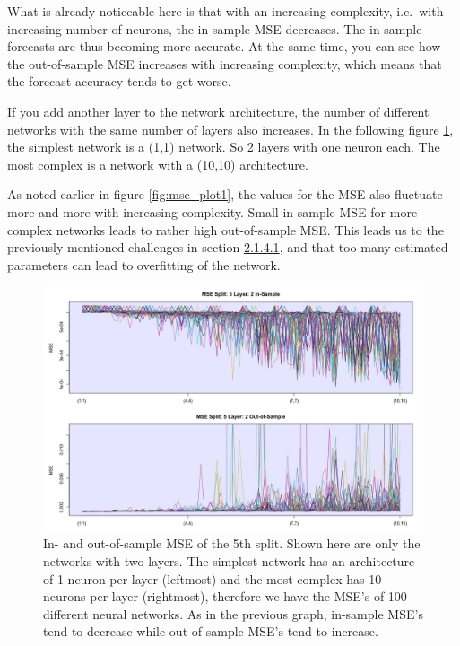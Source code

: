\documentclass[
]{article}
\begin{document}
What is already noticeable here is that with an increasing complexity,
i.e.~with increasing number of neurons, the in-sample MSE decreases. The
in-sample forecasts are thus becoming more accurate. At the same time,
you can see how the out-of-sample MSE increases with increasing
complexity, which means that the forecast accuracy tends to get worse.

\newpage

If you add another layer to the network architecture, the number of
different networks with the same number of layers also increases. In the
following figure \ref{fig:mse_plot2}, the simplest network is a (1,1)
network. So 2 layers with one neuron each. The most complex is a network
with a (10,10) architecture.

As noted earlier in figure \ref{fig:mse_plot1}, the values for the MSE
also fluctuate more and more with increasing complexity. Small in-sample
MSE for more complex networks leads to rather high out-of-sample MSE.
This leads us to the previously mentioned challenges in section
\protect\hyperlink{overfitting}{2.1.4.1}, and that too many estimated
parameters can lead to overfitting of the network.

\begin{figure}

{\centering \includegraphics[width=1\linewidth]{images/batch5/mse_5_layer2} 

}

\caption{In- and out-of-sample MSE of the 5th split. Shown here are only the networks with two layers. The simplest network has an architecture of 1 neuron per layer (leftmost) and the most complex has 10 neurons per layer (rightmost), therefore we have the MSE's of 100 different neural networks. As in the previous graph, in-sample MSE's tend to decrease while out-of-sample MSE's tend to increase.}\label{fig:mse_plot2}
\end{figure}
\end{document}
